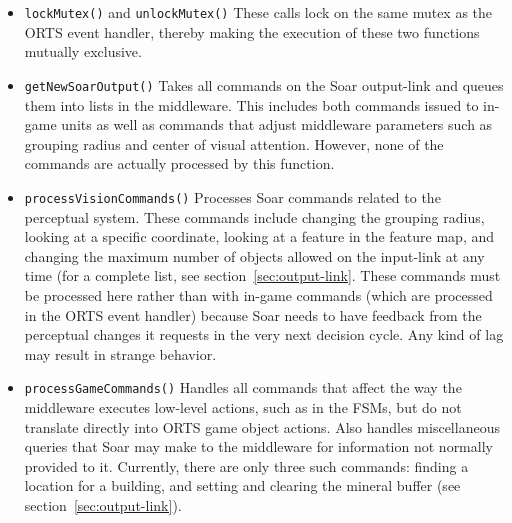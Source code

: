 \begin{itemize}

\item \verb|lockMutex()| and \verb|unlockMutex()|
  These calls lock on the same mutex as the ORTS event handler, thereby
  making the execution of these two functions mutually exclusive.

\item \verb|getNewSoarOutput()|
  Takes all commands on the Soar output-link and queues them into lists
  in the middleware. This includes both commands issued to in-game units
  as well as commands that adjust middleware parameters such as grouping
  radius and center of visual attention. However, none of the commands
  are actually processed by this function.

\item \verb|processVisionCommands()|
  Processes Soar commands related to the perceptual system. These
  commands include changing the grouping radius, looking at a specific
  coordinate, looking at a feature in the feature map, and changing the
  maximum number of objects allowed on the input-link at any time (for
  a complete list, see section~\ref{sec:output-link}. These commands
  must be processed here rather than with in-game commands (which are
  processed in the ORTS event handler) because Soar needs to have
  feedback from the perceptual changes it requests in the very next
  decision cycle. Any kind of lag may result in strange behavior.

\item \verb|processGameCommands()|
  Handles all commands that affect the way the middleware executes
  low-level actions, such as in the FSMs, but do not translate directly
  into ORTS game object actions. Also handles miscellaneous queries that
  Soar may make to the middleware for information not normally provided
  to it. Currently, there are only three such commands: finding a
  location for a building, and setting and clearing the mineral buffer
  (see section~\ref{sec:output-link}).

\end{itemize}
